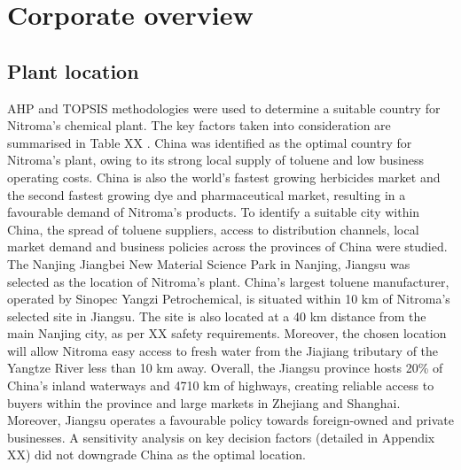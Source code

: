 \section{Corporate overview}
\subsection{Plant location}
\label{sec:location}
AHP and TOPSIS methodologies were used to determine a suitable country for Nitroma’s chemical plant. The key factors taken into consideration are summarised in Table XX . China was identified as the optimal country for Nitroma's plant, owing to its strong local supply of toluene and low business operating costs. China is also the world’s fastest growing herbicides market and the second fastest growing dye and pharmaceutical market, resulting in a favourable demand of Nitroma’s products. To identify a suitable city within China, the spread of toluene suppliers, access to distribution channels, local market demand and business policies across the provinces of China were studied. The Nanjing Jiangbei New Material Science Park in Nanjing, Jiangsu was selected as the location of Nitroma’s plant. China’s largest toluene manufacturer, operated by Sinopec Yangzi Petrochemical, is situated within 10 km of Nitroma’s selected site in Jiangsu. The site is also located at a 40 km distance from the main Nanjing city, as per XX safety requirements. Moreover, the chosen location will allow Nitroma easy access to fresh water from the Jiajiang tributary of the Yangtze River less than 10 km away. Overall, the Jiangsu province hosts 20\% of China’s inland waterways and 4710 km of highways, creating reliable access to buyers within the province and large markets in Zhejiang and Shanghai. Moreover, Jiangsu operates a favourable policy towards foreign-owned and private businesses. A sensitivity analysis on key decision factors (detailed in Appendix XX) did not downgrade China as the optimal location.

